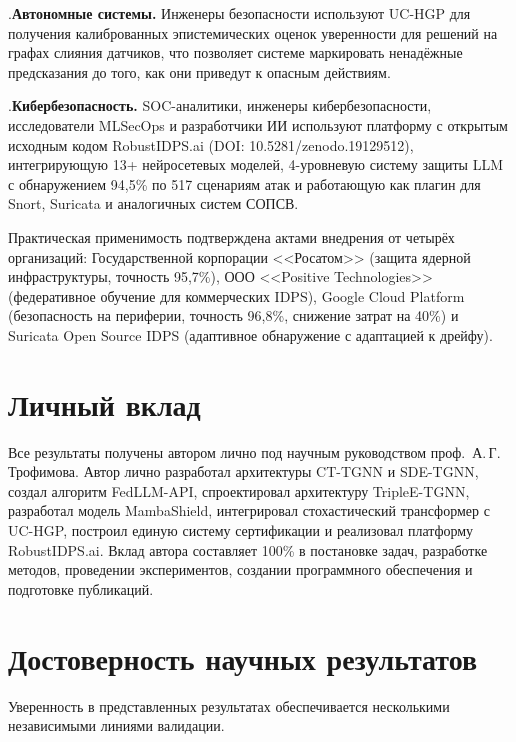 .\quad \textbf{Автономные системы.} Инженеры безопасности используют UC-HGP для получения калиброванных эпистемических оценок уверенности для решений на графах слияния датчиков, что позволяет системе маркировать ненадёжные предсказания до того, как они приведут к опасным действиям.

.\quad \textbf{Кибербезопасность.} SOC-аналитики, инженеры кибербезопасности, исследователи MLSecOps и разработчики ИИ используют платформу с открытым исходным кодом RobustIDPS.ai (DOI: 10.5281/zenodo.19129512), интегрирующую 13+ нейросетевых моделей, 4-уровневую систему защиты LLM с обнаружением 94,5\% по 517 сценариям атак и работающую как плагин для Snort, Suricata и аналогичных систем СОПСВ.

Практическая применимость подтверждена актами внедрения от четырёх организаций: Государственной корпорации <<Росатом>> (защита ядерной инфраструктуры, точность 95,7\%), ООО <<Positive Technologies>> (федеративное обучение для коммерческих IDPS), Google Cloud Platform (безопасность на периферии, точность 96,8\%, снижение затрат на 40\%) и Suricata Open Source IDPS (адаптивное обнаружение с адаптацией к дрейфу).


\section*{Личный вклад}

Все результаты получены автором лично под научным руководством проф.\ А.\,Г.\,Трофимова. Автор лично разработал архитектуры CT-TGNN и SDE-TGNN, создал алгоритм FedLLM-API, спроектировал архитектуру TripleE-TGNN, разработал модель MambaShield, интегрировал стохастический трансформер с UC-HGP, построил единую систему сертификации и реализовал платформу RobustIDPS.ai. Вклад автора составляет 100\% в постановке задач, разработке методов, проведении экспериментов, создании программного обеспечения и подготовке публикаций.


\section*{Достоверность научных результатов}

Уверенность в представленных результатах обеспечивается несколькими независимыми линиями валидации.

